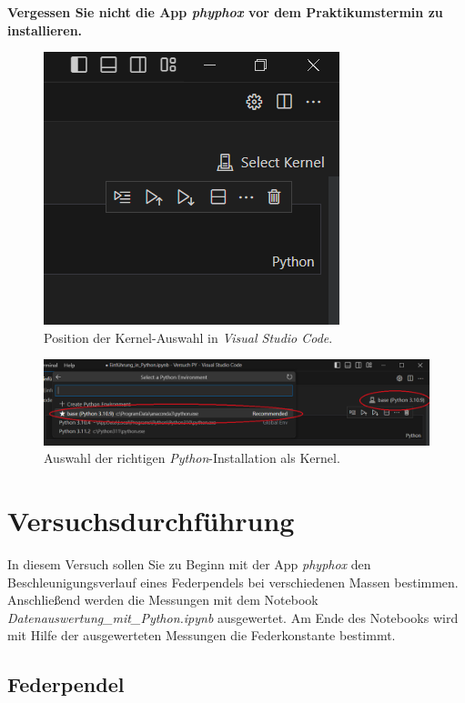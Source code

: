 \documentclass[12pt]{scrbook}
\begin{document}
\textbf{Vergessen Sie nicht die App \textit{phyphox} vor dem Praktikumstermin zu installieren.}

\begin{figure}[ht]
\center
\includegraphics[scale=0.7]{Select_Kernel.png}
\caption{Position der Kernel-Auswahl in \textit{Visual Studio Code}.}
\label{selectkernel}
\end{figure}
\begin{figure}[ht]
\center
\includegraphics[scale=0.7]{Auswahl_Kernel.png}
\caption{Auswahl der richtigen \textit{Python}-Installation als Kernel.}
\label{auswahlkernel}
\end{figure}


\section{Versuchsdurchführung}

In diesem Versuch sollen Sie zu Beginn mit der App \textit{phyphox} den Beschleunigungsverlauf eines Federpendels bei verschiedenen Massen bestimmen. Anschließend werden die Messungen mit dem Notebook \textit{Datenauswertung\_mit\_Python.ipynb} ausgewertet. Am Ende des Notebooks wird mit Hilfe der ausgewerteten Messungen die Federkonstante bestimmt.

\subsection{Federpendel}
\end{document}
